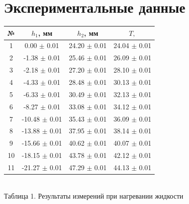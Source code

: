 \documentclass[a4paper, 12pt]{article}
\begin{document}
	\section{Экспериментальные данные}
	\begin{center}
		\begin{tabular} {|c | c |c |c |}
			\hline	
			№ & $h_1$, мм &  $h_2$, мм  &  $T,$  \textcelsius \\
			\hline
			1 & 0.00 $\pm$ 0.01 &  24.20 $\pm$ 0.01 & 24.04 $\pm$ 0.01 \\
			\hline
			2 & -1.38 $\pm$ 0.01 & 25.46 $\pm$ 0.01 & 26.09 $\pm$ 0.01 \\
			\hline
			3 & -2.18 $\pm$ 0.01 & 27.20 $\pm$ 0.01 & 28.10 $\pm$ 0.01 \\
\hline
			4 & -4.33 $\pm$ 0.01 & 28.48 $\pm$ 0.01 & 30.13 $\pm$ 0.01 \\
\hline
			5 & -6.33 $\pm$ 0.01 & 30.49 $\pm$ 0.01 & 32.13 $\pm$ 0.01 \\
\hline
			6 & -8.27 $\pm$ 0.01 & 33.08 $\pm$ 0.01 & 34.12 $\pm$ 0.01 \\
\hline
			7 & -10.48 $\pm$ 0.01 & 35.43 $\pm$ 0.01 & 36.09 $\pm$ 0.01 \\
\hline
			8 & -13.88 $\pm$ 0.01 & 37.95 $\pm$ 0.01 & 38.14 $\pm$ 0.01 \\
\hline
			9 & -15.66 $\pm$ 0.01 & 40.62 $\pm$ 0.01 & 40.07 $\pm$ 0.01 \\
\hline
			10 & -18.15 $\pm$ 0.01 & 43.78 $\pm$ 0.01 & 42.12 $\pm$ 0.01 \\
\hline
			11 & -21.27 $\pm$ 0.01 & 47.29 $\pm$ 0.01 & 44.13 $\pm$ 0.01 \\
\hline
		\end{tabular}\\
		Таблица 1. Результаты измерений при нагревании жидкости
	\end{center}
\end{document}
